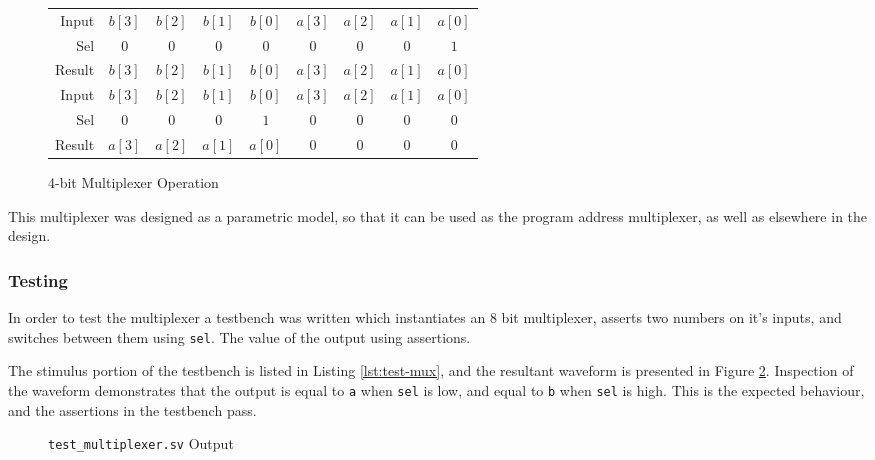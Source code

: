 \begin{figure}[ht]
	\centering
	\begin{tabular}{r *{8}{|c}}
		Input & $b[3]$ & $b[2]$ & $b[1]$ & $b[0]$ & $a[3]$ & $a[2]$ & $a[1]$ & $a[0]$ \\
		Sel & $0$ & $0$ & $0$ & $0$ & $0$ & $0$ & $0$ & $1$  \\
		Result & \shadeCell $b[3]$ & \shadeCell $b[2]$ & \shadeCell $b[1]$ & \shadeCell $b[0]$ & $a[3]$ & $a[2]$ & $a[1]$ & $a[0]$ \\
		\midrule
		Input & $b[3]$ & $b[2]$ & $b[1]$ & $b[0]$ & $a[3]$ & $a[2]$ & $a[1]$ & $a[0]$ \\
		Sel & $0$ & $0$ & $0$ & $1$ & $0$ & $0$ & $0$ & $0$  \\
		Result & \shadeCell $a[3]$ & \shadeCell $a[2]$ & \shadeCell $a[1]$ & \shadeCell $a[0]$ & $0$ & $0$  & $0$  & $0$  \\
	\end{tabular}
	\caption{4-bit Multiplexer Operation}
	\label{fig:mux-operation}
\end{figure}

This multiplexer was designed as a parametric model, so that it can be used as the program address multiplexer, as well as elsewhere in the design.


\subsubsection{Testing}
In order to test the multiplexer a testbench was written which instantiates an $8$ bit multiplexer, asserts two numbers on it's inputs, and switches between them using \texttt{sel}. The value of the output using assertions.

The stimulus portion of the testbench is listed in Listing \ref{lst:test-mux}, and the resultant waveform is presented in Figure \ref{fig:test-mux}. Inspection of the waveform demonstrates that the output is equal to \texttt{a}  when \texttt{sel} is low, and equal to \texttt{b} when \texttt{sel} is high. This is the expected behaviour, and the assertions in the testbench pass.




\begin{figure}[ht]
	\centering
	
	\caption{\texttt{test\_multiplexer.sv} Output}
	\label{fig:test-mux}
\end{figure}

